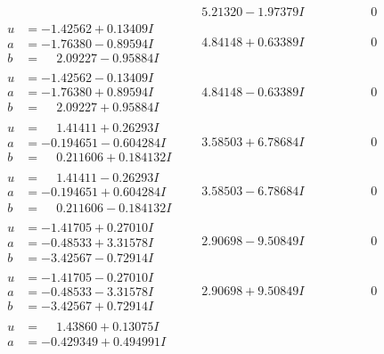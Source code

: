 \documentclass[1p]{elsarticle_modified}
\theoremstyle{definition}
\begin{document}
$$\begin{array}{c|c|c}
 & \phantom{-}5.21320 - 1.97379 I & \phantom{-0.000000 } 0 \\ \hline\begin{aligned}
u &= -1.42562 + 0.13409 I \\
a &= -1.76380 - 0.89594 I \\
b &= \phantom{-}2.09227 - 0.95884 I\end{aligned}
 & \phantom{-}4.84148 + 0.63389 I & \phantom{-0.000000 } 0 \\ \hline\begin{aligned}
u &= -1.42562 - 0.13409 I \\
a &= -1.76380 + 0.89594 I \\
b &= \phantom{-}2.09227 + 0.95884 I\end{aligned}
 & \phantom{-}4.84148 - 0.63389 I & \phantom{-0.000000 } 0 \\ \hline\begin{aligned}
u &= \phantom{-}1.41411 + 0.26293 I \\
a &= -0.194651 - 0.604284 I \\
b &= \phantom{-}0.211606 + 0.184132 I\end{aligned}
 & \phantom{-}3.58503 + 6.78684 I & \phantom{-0.000000 } 0 \\ \hline\begin{aligned}
u &= \phantom{-}1.41411 - 0.26293 I \\
a &= -0.194651 + 0.604284 I \\
b &= \phantom{-}0.211606 - 0.184132 I\end{aligned}
 & \phantom{-}3.58503 - 6.78684 I & \phantom{-0.000000 } 0 \\ \hline\begin{aligned}
u &= -1.41705 + 0.27010 I \\
a &= -0.48533 + 3.31578 I \\
b &= -3.42567 - 0.72914 I\end{aligned}
 & \phantom{-}2.90698 - 9.50849 I & \phantom{-0.000000 } 0 \\ \hline\begin{aligned}
u &= -1.41705 - 0.27010 I \\
a &= -0.48533 - 3.31578 I \\
b &= -3.42567 + 0.72914 I\end{aligned}
 & \phantom{-}2.90698 + 9.50849 I & \phantom{-0.000000 } 0 \\ \hline\begin{aligned}
u &= \phantom{-}1.43860 + 0.13075 I \\
a &= -0.429349 + 0.494991 I \\

\end{aligned}
\end{array}$$
\end{document}
